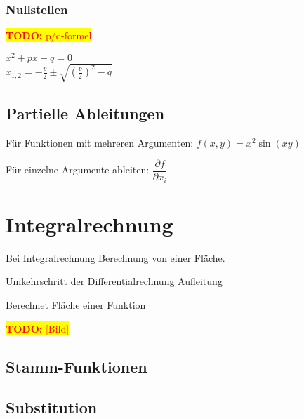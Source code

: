 \documentclass[10pt,a4paper]{article}
\newcommand{\todo}[1]{\begin{flushleft} \colorbox{yellow}{\textcolor{red}{\textbf{TODO:} {#1}}}\end{flushleft} }
\begin{document}


\subsubsection{Nullstellen}


\todo{p/q-formel}

$ x^2+px+q=0$\\
$x_{1,2} = - \frac{p}{2}\pm\sqrt{\left(\frac{p}2\right)^2 - q}$



\subsection{Partielle Ableitungen}

Für Funktionen mit mehreren Argumenten:
$f(x,y) = x^2 \sin(xy)$

Für einzelne Argumente ableiten:
$\dfrac{\partial f}{\partial x_i}$





\section{Integralrechnung}

Bei Integralrechnung Berechnung von einer Fläche.

Umkehrschritt der Differentialrechnung
Aufleitung

Berechnet Fläche einer Funktion
\todo{[Bild]}


\subsection{Stamm-Funktionen}



\subsection{Substitution}

\end{document}
